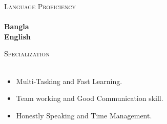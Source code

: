 \documentclass[a4paper]{article}
\newcommand{\lineunder} {
    \vspace*{-8pt} \\
    \hspace*{-18pt} \hrulefill \\
}
\newcommand{\header} [1] {
    {\hspace*{-18pt}\vspace*{9pt} \textsc{#1}}
    \vspace*{-9pt} \lineunder
}
\begin{document}
      \header{Language Proficiency}
      \vspace{2mm}
     \textbf{Bangla}\\
     \textbf{English}\\
\vspace{4mm}
\newpage
      \header{Specialization}
      \vspace{1mm}
   \begin{itemize}
        \item   Multi-Tasking and Fast Learning.  
        \item   Team working and Good Communication skill.
        \item   Honestly Speaking and Time Management.
   \end{itemize}

    
\end{document}
